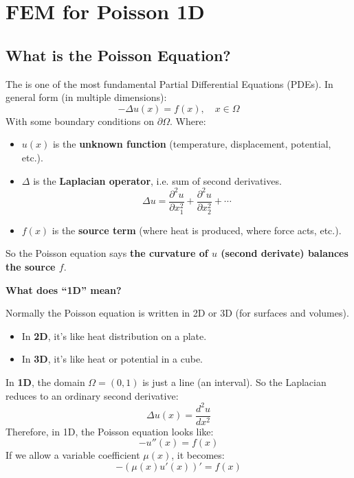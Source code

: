 \section{FEM for Poisson 1D}

\subsection{What is the Poisson Equation?}

The  is one of the most fundamental Partial Differential Equations (PDEs). In general form (in multiple dimensions):
\begin{equation}
    - \Delta u(x) = f(x), \quad x \in \Omega
\end{equation}
With some boundary conditions on $\partial \Omega$. Where:
\begin{itemize}
    \item $u(x)$ is the \textbf{unknown function} (temperature, displacement, potential, etc.).
    \item $\Delta$ is the \textbf{Laplacian operator}, i.e. sum of second derivatives.
    \begin{equation}
        \Delta u = \dfrac{\partial^{2} u}{\partial x_{1}^{2}} + \dfrac{\partial^{2} u}{\partial x_{2}^{2}} + \cdots
    \end{equation}
    \item $f(x)$ is the \textbf{source term} (where heat is produced, where force acts, etc.).
\end{itemize}
So the Poisson equation says \textbf{the curvature of $u$ (second derivate) balances the source $f$}.

\highspace
\begin{flushleft}
    \textcolor{Green3}{ \textbf{What does ``1D'' mean?}}
\end{flushleft}
Normally the Poisson equation is written in 2D or 3D (for surfaces and volumes).
\begin{itemize}
    \item In \textbf{2D}, it's like heat distribution on a plate.
    \item In \textbf{3D}, it's like heat or potential in a cube.
\end{itemize}
In \textbf{1D}, the domain $\Omega = (0,1)$ is just a line (an interval). So the Laplacian reduces to an ordinary second derivative:
\begin{equation*}
    \Delta u(x) = \frac{d^2 u}{dx^2}
\end{equation*}
Therefore, in 1D, the Poisson equation looks like:
\begin{equation}
    - u''(x) = f(x)    
\end{equation}
If we allow a variable coefficient $\mu(x)$, it becomes:
\begin{equation*}
    - \left(\mu(x) u'(x)\right)' = f(x)    
\end{equation*}

